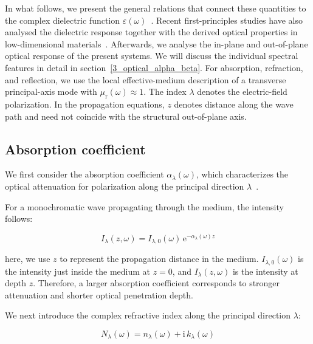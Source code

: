 In what follows, we present the general relations that
connect these quantities to the complex dielectric function $\varepsilon(\omega)$~\cite{born2013principles,wooten2013optical,dressel2002electrodynamics,fox2010optical}.
Recent first-principles studies have also analysed the dielectric response together with the derived optical properties in low-dimensional materials~\cite{niu2024electronic,khan2025insight,albert2024optical,huang2023optical,cheng2025two}.
Afterwards, we analyse the in-plane and out-of-plane optical response of the present systems.
We will discuss the individual spectral features in detail in section~\ref{3_optical_alpha_beta}.
For absorption, refraction, and reflection, we use the local effective-medium description of a transverse principal-axis mode with $\mu_{\mathrm{r}}(\omega)\approx1$.
The index $\lambda$ denotes the electric-field polarization.
In the propagation equations, $z$ denotes distance along the wave path and need not coincide with the structural out-of-plane axis.

\FloatBarrier
\subsection{Absorption coefficient}

We first consider the absorption coefficient $\alpha_{\lambda}(\omega)$,
which characterizes the optical attenuation for polarization along the principal direction $\lambda$~\cite{lin2023recent}.

For a monochromatic wave propagating through the medium,
the intensity follows:

\begin{equation}
    I_{\lambda}(z,\omega)= I_{\lambda,0}(\omega)\,\mathrm{e}^{-\alpha_{\lambda}(\omega) z}
\label{intensity_attenuation_from_absorption_coefficient}
\end{equation}

here, we use $z$ to represent the propagation distance in the medium.
$I_{\lambda,0}(\omega)$ is the intensity just inside the medium at $z=0$,
and $I_{\lambda}(z,\omega)$ is the intensity at depth $z$.
Therefore, a larger absorption coefficient corresponds to
stronger attenuation and shorter optical penetration depth.

We next introduce the complex refractive index along the
principal direction $\lambda$:

\begin{equation}
    N_{\lambda}(\omega) = n_{\lambda}(\omega) +\mathrm{i}\, k_{\lambda}(\omega)
\label{complex_refractive_index_for_absorption_coefficient}
\end{equation}

